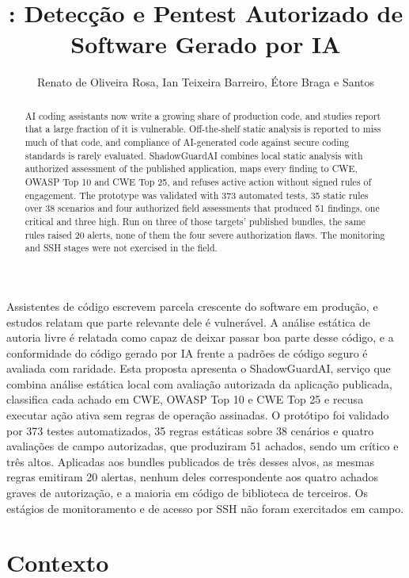 \documentclass[12pt]{article}
\title{\product{}: Detecção e Pentest Autorizado de Software Gerado por IA}
\author{Renato de Oliveira Rosa\inst{1}, Ian Teixeira Barreiro\inst{2}, Étore Braga e Santos\inst{3}}
\newcommand{\product}{ShadowGuardAI}
\begin{document}
\maketitle

\begin{abstract}
AI coding assistants now write a growing share of production code, and studies report that a
large fraction of it is vulnerable. Off-the-shelf static
analysis is reported to miss much of that code, and compliance of AI-generated code against
secure coding standards is rarely evaluated. ShadowGuardAI combines local static analysis with authorized assessment of the published application, maps every finding to CWE, OWASP Top 10 and CWE Top 25, and refuses active action without signed rules of engagement. The prototype was validated with 373 automated tests, 35 static
rules over 38 scenarios and four authorized field assessments that produced 51 findings, one
critical and three high. Run on three of those targets' published bundles, the same rules
raised 20 alerts, none of them the four severe authorization flaws. The monitoring and SSH stages were not exercised in the field.
\end{abstract}

\begin{resumo}
Assistentes de código escrevem parcela crescente do software em produção, e estudos relatam que
parte relevante dele é vulnerável. A análise estática de autoria livre é relatada como capaz de deixar passar boa
parte desse código, e a conformidade do código gerado por IA frente a padrões de código seguro
é avaliada com raridade. Esta proposta apresenta o \product{}, serviço que combina análise
estática local com avaliação autorizada da aplicação publicada, classifica cada achado em CWE,
OWASP Top 10 e CWE Top 25 e recusa executar ação ativa sem regras de operação assinadas. O
protótipo foi validado por 373 testes automatizados, 35 regras estáticas sobre 38 cenários e
quatro avaliações de campo autorizadas, que produziram 51 achados, sendo um crítico e três
altos. Aplicadas aos bundles publicados de três desses alvos, as mesmas regras emitiram 20
alertas, nenhum deles correspondente aos quatro achados graves de autorização, e a maioria em
código de biblioteca de terceiros. Os estágios de monitoramento e de acesso por SSH não foram
exercitados em campo.
\end{resumo}

\section{Contexto}
\end{document}
